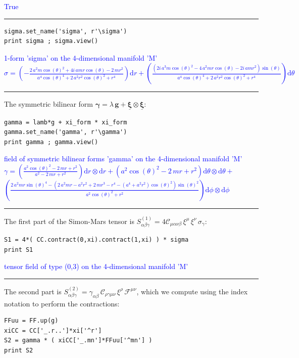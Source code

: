 \documentclass[a4paper]{jpconf}
\newcommand{\w}[1]{\bm{#1}}
\newcommand{\soutput}[1]{\textcolor{blue}{#1}\\[-0.8ex]\rule{\textwidth}{0.4pt}}
\begin{document}
\soutput{True}
\begin{verbatim}
sigma.set_name('sigma', r'\sigma')
print sigma ; sigma.view()
\end{verbatim}
\soutput{1-form 'sigma' on the 4-dimensional manifold 'M'\\
$\sigma = \left( -\frac{2 \, a^{2} m \cos\left(\theta\right)^{2} + 4 i \,
a m r \cos\left(\theta\right) - 2 \, m r^{2}}{a^{4}
\cos\left(\theta\right)^{4} + 2 \, a^{2} r^{2}
\cos\left(\theta\right)^{2} + r^{4}} \right) \mathrm{d} r + \left(
\frac{{\left(2 i \, a^{3} m \cos\left(\theta\right)^{2} - 4 \, a^{2} m r
\cos\left(\theta\right) - 2 i \, a m r^{2}\right)}
\sin\left(\theta\right)}{a^{4} \cos\left(\theta\right)^{4} + 2 \, a^{2}
r^{2} \cos\left(\theta\right)^{2} + r^{4}} \right) \mathrm{d} \theta$}
The symmetric bilinear form
$\w{\gamma} = \lambda \, \w{g} + \underline{\w{\xi}}\otimes\underline{\w{\xi}}$:
\begin{verbatim}
gamma = lamb*g + xi_form * xi_form
gamma.set_name('gamma', r'\gamma')
print gamma ; gamma.view()
\end{verbatim}
\soutput{field of symmetric bilinear forms 'gamma' on the 4-dimensional manifold
'M'\\
$\gamma = \left( \frac{a^{2} \cos\left(\theta\right)^{2} - 2 \, m r +
r^{2}}{a^{2} - 2 \, m r + r^{2}} \right) \mathrm{d} r\otimes \mathrm{d}
r + \left( a^{2} \cos\left(\theta\right)^{2} - 2 \, m r + r^{2} \right)
\mathrm{d} \theta\otimes \mathrm{d} \theta +$\\
$\left( \frac{2 \, a^{2} m r
\sin\left(\theta\right)^{4} - {\left(2 \, a^{2} m r - a^{2} r^{2} + 2 \,
m r^{3} - r^{4} - {\left(a^{4} + a^{2} r^{2}\right)}
\cos\left(\theta\right)^{2}\right)} \sin\left(\theta\right)^{2}}{a^{2}
\cos\left(\theta\right)^{2} + r^{2}} \right) \mathrm{d} \phi\otimes
\mathrm{d} \phi$}
The first part of the Simon-Mars tensor is 
$S^{(1)}_{\alpha\beta\gamma} = 4 \mathcal{C}_{\mu\alpha\nu\beta} \, \xi^\mu \, \xi^\nu \, \sigma_\gamma$:
\begin{verbatim}
S1 = 4*( CC.contract(0,xi).contract(1,xi) ) * sigma
print S1
\end{verbatim}
\soutput{tensor field of type (0,3) on the 4-dimensional manifold 'M'}
The second part is 
$S^{(2)}_{\alpha\beta\gamma} = \gamma_{\alpha\beta} \, \mathcal{C}_{\rho\gamma\mu\nu} \, \xi^\rho \, \mathcal{F}^{\mu\nu}$, which we 
compute using the index notation to perform the contractions:
\begin{verbatim}
FFuu = FF.up(g)
xiCC = CC['_.r..']*xi['^r']
S2 = gamma * ( xiCC['_.mn']*FFuu['^mn'] )
print S2
\end{verbatim}
\end{document}
